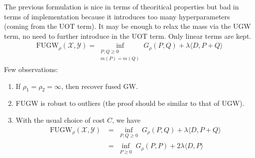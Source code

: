 \documentclass{article}
\theoremstyle{remark}
\begin{document}
The previous formulation is nice in terms of theoritical properties but bad in terms of implementation because it introduces too many hyperparameters (coming from the UOT term). It may be enough to relax the mass via the UGW term, no need to further introduce in the UOT term. Only linear terms are kept.
\begin{equation*}
    \begin{split}
     \text{FUGW}_{\rho}(\mathcal X, \mathcal Y) = \inf_{\substack{P, Q \geq 0 \\ m(P) = m(Q)}} G_{\rho}(P, Q) + \lambda \langle D, P+Q \rangle
    \end{split}
\end{equation*}
Few observations:
\begin{enumerate}
    \item If $\rho_1 = \rho_2 = \infty$, then recover fused GW.
    \item FUGW is robust to outliers (the proof should be similar to that of UGW).
    \item With the usual choice of cost $C$, we have
    \begin{equation*}
    \begin{split}
        \text{FUGW}_{\rho}(\mathcal X, \mathcal Y) &= \inf_{\substack{P, Q \geq 0 }} G_{\rho}(P, Q) + \lambda \langle D, P+Q \rangle \\
        &= \inf_{\substack{P \geq 0 }} G_{\rho}(P, P) + 2 \lambda \langle D, P \rangle
    \end{split}
    \end{equation*}
\end{enumerate}
\end{document}
